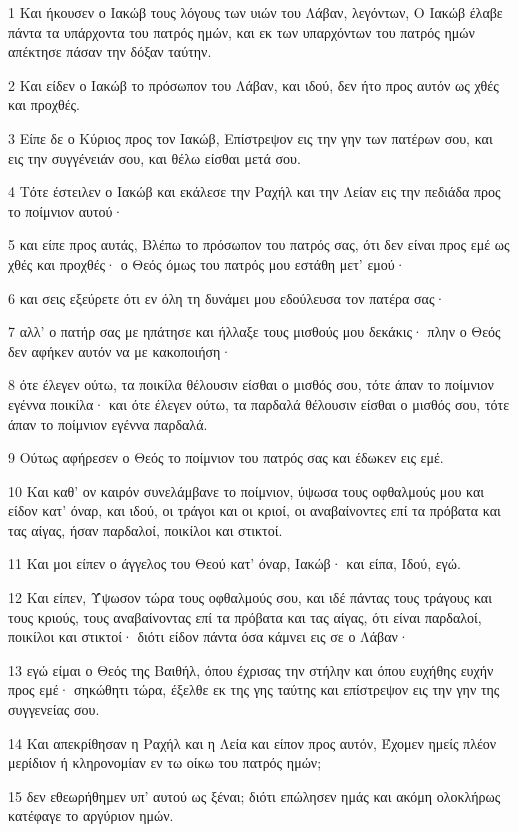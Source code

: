 \par 1 Και ήκουσεν ο Ιακώβ τους λόγους των υιών του Λάβαν, λεγόντων, Ο Ιακώβ έλαβε πάντα τα υπάρχοντα του πατρός ημών, και εκ των υπαρχόντων του πατρός ημών απέκτησε πάσαν την δόξαν ταύτην.
\par 2 Και είδεν ο Ιακώβ το πρόσωπον του Λάβαν, και ιδού, δεν ήτο προς αυτόν ως χθές και προχθές.
\par 3 Είπε δε ο Κύριος προς τον Ιακώβ, Επίστρεψον εις την γην των πατέρων σου, και εις την συγγένειάν σου, και θέλω είσθαι μετά σου.
\par 4 Τότε έστειλεν ο Ιακώβ και εκάλεσε την Ραχήλ και την Λείαν εις την πεδιάδα προς το ποίμνιον αυτού·
\par 5 και είπε προς αυτάς, Βλέπω το πρόσωπον του πατρός σας, ότι δεν είναι προς εμέ ως χθές και προχθές· ο Θεός όμως του πατρός μου εστάθη μετ' εμού·
\par 6 και σεις εξεύρετε ότι εν όλη τη δυνάμει μου εδούλευσα τον πατέρα σας·
\par 7 αλλ' ο πατήρ σας με ηπάτησε και ήλλαξε τους μισθούς μου δεκάκις· πλην ο Θεός δεν αφήκεν αυτόν να με κακοποιήση·
\par 8 ότε έλεγεν ούτω, τα ποικίλα θέλουσιν είσθαι ο μισθός σου, τότε άπαν το ποίμνιον εγέννα ποικίλα· και ότε έλεγεν ούτω, τα παρδαλά θέλουσιν είσθαι ο μισθός σου, τότε άπαν το ποίμνιον εγέννα παρδαλά.
\par 9 Ούτως αφήρεσεν ο Θεός το ποίμνιον του πατρός σας και έδωκεν εις εμέ.
\par 10 Και καθ' ον καιρόν συνελάμβανε το ποίμνιον, ύψωσα τους οφθαλμούς μου και είδον κατ' όναρ, και ιδού, οι τράγοι και οι κριοί, οι αναβαίνοντες επί τα πρόβατα και τας αίγας, ήσαν παρδαλοί, ποικίλοι και στικτοί.
\par 11 Και μοι είπεν ο άγγελος του Θεού κατ' όναρ, Ιακώβ· και είπα, Ιδού, εγώ.
\par 12 Και είπεν, Ύψωσον τώρα τους οφθαλμούς σου, και ιδέ πάντας τους τράγους και τους κριούς, τους αναβαίνοντας επί τα πρόβατα και τας αίγας, ότι είναι παρδαλοί, ποικίλοι και στικτοί· διότι είδον πάντα όσα κάμνει εις σε ο Λάβαν·
\par 13 εγώ είμαι ο Θεός της Βαιθήλ, όπου έχρισας την στήλην και όπου ευχήθης ευχήν προς εμέ· σηκώθητι τώρα, έξελθε εκ της γης ταύτης και επίστρεψον εις την γην της συγγενείας σου.
\par 14 Και απεκρίθησαν η Ραχήλ και η Λεία και είπον προς αυτόν, Έχομεν ημείς πλέον μερίδιον ή κληρονομίαν εν τω οίκω του πατρός ημών;
\par 15 δεν εθεωρήθημεν υπ' αυτού ως ξέναι; διότι επώλησεν ημάς και ακόμη ολοκλήρως κατέφαγε το αργύριον ημών.
